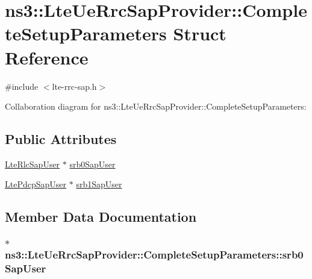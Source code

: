 \hypertarget{structns3_1_1LteUeRrcSapProvider_1_1CompleteSetupParameters}{}\section{ns3\+:\+:Lte\+Ue\+Rrc\+Sap\+Provider\+:\+:Complete\+Setup\+Parameters Struct Reference}
\label{structns3_1_1LteUeRrcSapProvider_1_1CompleteSetupParameters}


{\ttfamily \#include $<$lte-\/rrc-\/sap.\+h$>$}



Collaboration diagram for ns3\+:\+:Lte\+Ue\+Rrc\+Sap\+Provider\+:\+:Complete\+Setup\+Parameters\+:
\subsection*{Public Attributes}
\begin{DoxyCompactItemize}
\item 
\hyperlink{classns3_1_1LteRlcSapUser}{Lte\+Rlc\+Sap\+User} $\ast$ \hyperlink{structns3_1_1LteUeRrcSapProvider_1_1CompleteSetupParameters_a68d77c33755ab60ec5a0bc5d2378faf0}{srb0\+Sap\+User}
\item 
\hyperlink{classns3_1_1LtePdcpSapUser}{Lte\+Pdcp\+Sap\+User} $\ast$ \hyperlink{structns3_1_1LteUeRrcSapProvider_1_1CompleteSetupParameters_a63525022fa5a6b909c984ed2c3f2f93b}{srb1\+Sap\+User}
\end{DoxyCompactItemize}


\subsection{Member Data Documentation}
\subsubsection[{\texorpdfstring{srb0\+Sap\+User}{srb0SapUser}}]{$\ast$ ns3\+::\+Lte\+Ue\+Rrc\+Sap\+Provider\+::\+Complete\+Setup\+Parameters\+::srb0\+Sap\+User}\hypertarget{structns3_1_1LteUeRrcSapProvider_1_1CompleteSetupParameters_a68d77c33755ab60ec5a0bc5d2378faf0}{}\label{structns3_1_1LteUeRrcSapProvider_1_1CompleteSetupParameters_a68d77c33755ab60ec5a0bc5d2378faf0}
